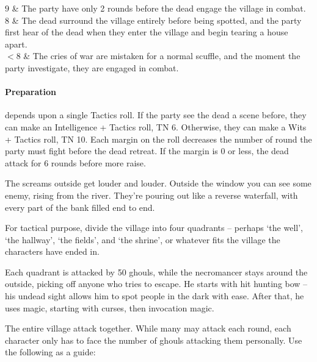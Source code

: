 \begin{multicols}{2}
\begin{rollchart}
	$9$ & The party have only 2 rounds before the dead engage the village in combat. \\

	$8$ & The dead surround the village entirely before being spotted, and the party first hear of the dead when they enter the village and begin tearing a house apart. \\

	$<8$ & The cries of war are mistaken for a normal scuffle, and the moment the party investigate, they are engaged in combat. \\

\end{rollchart}

\paragraph{Preparation} depends upon a single Tactics roll.
If the party see the dead a scene before, they can make an Intelligence + Tactics roll, TN 6.
Otherwise, they can make a Wits + Tactics roll, TN 10.
Each margin on the roll decreases the number of round the party must fight before the dead retreat.
If the margin is 0 or less, the dead attack for 6 rounds before more raise.

\begin{boxtext}

	The screams outside get louder and louder.
	Outside the window you can see some enemy, rising from the river.
	They're pouring out like a reverse waterfall, with every part of the bank filled end to end.

\end{boxtext}

For tactical purpose, divide the village into four quadrants -- perhaps `the well', `the hallway', `the fields', and `the shrine', or whatever fits the village the characters have ended in.

Each quadrant is attacked by 50 ghouls, while the necromancer stays around the outside, picking off anyone who tries to escape.  He starts with hit hunting bow -- his undead sight allows him to spot people in the dark with ease.  After that, he uses magic, starting with curses, then invocation magic.

The entire village attack together.
While many may attack each round, each character only has to face the number of ghouls attacking them personally.
Use the following as a guide:

\begin{rollchart}


\end{rollchart}
\end{multicols}
